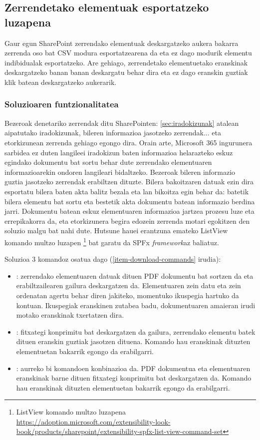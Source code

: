 \subsection{Zerrendetako elementuak esportatzeko luzapena}
Gaur egun SharePoint zerrendako elementuak deskargatzeko aukera bakarra zerrenda oso bat CSV modura esportatzearena da eta ez dago modurik elementu indibidualak esportatzeko. 
Are gehiago, zerrendetako elementuetako eranskinak deskargatzeko banan banan deskargatu behar dira eta ez dago eranskin guztiak klik batean deskargatzeko aukerarik.

\subsubsection{Soluzioaren funtzionalitatea}
Bezeroak denetariko zerrendak ditu SharePointen: \ref{sec:iradokizunak} atalean aipatutako iradokizunak, bileren informazioa jasotzeko zerrendak... eta etorkizunean zerrenda gehiago egongo dira.
Orain arte, Microsoft 365 ingurunera sarbidea ez duten langileei iradokizun baten informazioa helarazteko eskuz egindako dokumentu bat sortu behar dute zerrendako elementuaren informazioarekin ondoren langileari bidaltzeko.
Bezeroak bileren informazio guztia jasotzeko zerrendak erabiltzen dituzte. Bilera bakoitzaren datuak ezin dira esportatu bilera baten akta balitz bezala eta lan bikoitza egin behar da: batetik bilera elementu bat sortu eta bestetik akta dokumentu batean informazio berdina jarri.
Dokumentu batean eskuz elementuaren informazioa jartzea prozesu luze eta errepikakorra da, eta etorkizunera begira edozein zerrenda motari egokitzen den soluzio malgu bat nahi dute. 
Hutsune hauei erantzuna emateko ListView komando multzo luzapen \footnote{ListView komando multzo luzapena \url{https://adoption.microsoft.com/extensibility-look-book/products/sharepoint/extensibility-spfx-list-view-command-set}} bat garatu da SPFx \textit{framework}az baliatuz. 

Soluzioa 3 komandoz osatua dago (\ref{item-download-commands} irudia): 
\begin{itemize}
  \item {}: zerrendako elementuaren datuak dituen PDF dokumentu bat sortzen da eta erabiltzailearen gailura deskargatzen da. Elementuaren zein datu eta zein ordenatan agertu behar diren jakiteko, momentuko ikuspegia hartuko da kontuan. Ikuspegiak eranskinen zutabea badu, dokumentuaren amaieran irudi motako eranskinak txertatzen dira. 
  \item {}: fitxategi konprimitu bat deskargatzen da gailura, zerrendako elementu batek dituen eranskin guztiak jasotzen dituena. Komando hau eranskinak dituzten elementuetan bakarrik egongo da erabilgarri.
  \item {}: aurreko bi komandoen konbinazioa da. PDF dokumentua eta elementuaren eranskinak barne dituen fitxategi konprimitu bat deskargatzen da. Komando hau eranskinak dituzten elementuetan bakarrik egongo da erabilgarri.
\end{itemize}

